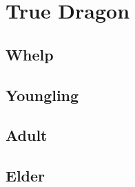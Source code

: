 \section{True Dragon}

\subsection{Whelp}

\subsection{Youngling}

\subsection{Adult}

\subsection{Elder}